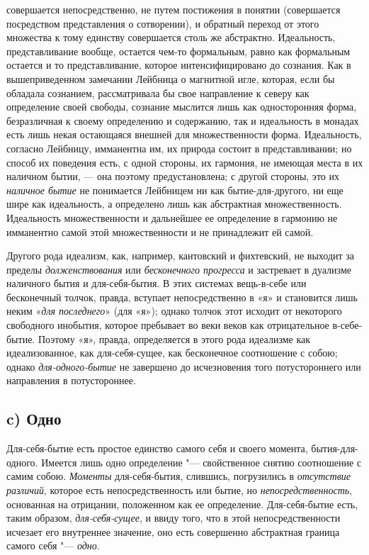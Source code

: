 совершается непосредственно, не путем постижения в понятии (совершается
посредством представления о сотворении), и обратный переход от этого
множества к тому единству совершается столь же абстрактно. Идеальность,
представливание вообще, остается чем-то формальным, равно как формальным
остается и то представливание, которое интенсифицировано до сознания. Как в
вышеприведенном замечании
Лейбница о магнитной игле, которая, если
бы обладала сознанием, рассматривала бы свое направление к северу как
определение своей свободы, сознание мыслится лишь как односторонняя форма,
безразличная к своему определению и содержанию, так и идеальность в монадах
есть лишь некая остающаяся внешней для множественности форма. Идеальность,
согласно Лейбницу, имманентна им, их природа состоит в представливании; но
способ их поведения есть, с одной стороны, их гармония, не имеющая места в
их наличном бытии, — она поэтому предустановлена; с другой стороны, это их
{\em наличное бытие} не понимается Лейбницем ни как
бытие-для-другого, ни еще шире как идеальность, а определено лишь как
абстрактная множественность. Идеальность множественности и дальнейшее ее
определение в гармонию не имманентно самой этой множественности и не
принадлежит ей самой.

Другого рода идеализм, как, например, кантовский и фихтевский, не выходит за
пределы {\em долженствования} или
{\em бесконечного прогресса} и застревает в дуализме
наличного бытия и для-себя-бытия. В этих системах вещь-в-себе или
бесконечный толчок, правда, вступает непосредственно в «я» и становится
лишь неким «{\em для последнего}» (для «я»); однако
толчок этот исходит от некоторого свободного инобытия, которое пребывает во
веки веков как отрицательное в-себе-бытие. Поэтому «я», правда,
определяется в этого рода идеализме как идеализованное, как для-себя-сущее,
как бесконечное соотношение с собою; однако
{\em для-одного-бытие} не завершено до исчезновения
того потустороннего или направления в потустороннее.

\subsection*{c) Одно}
Для-себя-бытие есть простое единство самого себя и своего момента,
бытия-для-одного. Имеется лишь одно определение "--- свойственное снятию
соотношение с самим собою. {\em Моменты}
для-себя-бытия, слившись, погрузились в {\em отсутствие
различий}, которое есть непосредственность или бытие, но
{\em непосредственность}, основанная на отрицании,
положенном как ее определение. Для-себя-бытие есть, таким образом,
{\em для-себя-сущее}, и ввиду того, что в этой
непосредственности исчезает его внутреннее значение, оно есть совершенно
абстрактная граница самого себя "--- {\em одно}.

